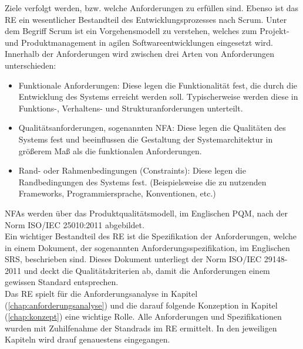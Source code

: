     Ziele verfolgt werden, bzw. welche Anforderungen zu erfüllen sind. Ebenso ist das \acl{RE} ein wesentlicher 
    Bestandteil des Entwicklungsprozesses nach Scrum. Unter dem Begriff Scrum ist ein Vorgehensmodell zu verstehen, 
    welches zum Projekt- und Produktmanagement in agilen Softwareentwicklungen eingesetzt wird. 
    \\
    \linebreak
    Innerhalb der Anforderungen %
    wird zwischen drei Arten von Anforderungen unterschieden: 
    \begin{itemize}
        \item Funktionale Anforderungen: Diese legen die Funktionalität fest, die durch die Entwicklung des Systems 
            erreicht werden soll. Typischerweise werden diese in Funktions-, Verhaltens- und Strukturanforderungen unterteilt.
        \item Qualitätsanforderungen, sogenannten \ac{NFA}: Diese legen die Qualitäten des Systems fest und beeinflussen die Gestaltung der 
            Systemarchitektur in größerem Maß als die funktionalen Anforderungen.
        \item Rand- oder Rahmenbedingungen (Constraints): Diese legen die Randbedingungen des Systems fest. (Beispielsweise die zu nutzenden Frameworks, Programmiersprache, Konventionen, etc.)
    \end{itemize}
    \acp{NFA} werden über das Produktqualitätsmodell, im Englischen \ac{PQM}, nach der Norm ISO/IEC 25010:2011 abgebildet. \cite{ISO-IEC-PQM2011}
    \\
    \linebreak
    Ein wichtiger Bestandteil des \acl{RE} ist die Spezifikation der Anforderungen, welche in einem Dokument, der 
    sogenannten Anforderungsspezifikation, im Englischen \ac{SRS}, beschrieben sind. Dieses Dokument unterliegt der 
    Norm ISO/IEC 29148-2011 und deckt die Qualitätskriterien ab, damit die Anforderungen einem gewissen Standard 
    entsprechen. 
    \\
    \linebreak
    Das \acl{RE} spielt für die Anforderungsanalyse in Kapitel (\ref{chap:anforderungsanalyse}) und die darauf folgende 
    Konzeption in Kapitel (\ref{chap:konzept}) eine wichtige Rolle. Alle Anforderungen und Spezifikationen wurden 
    mit Zuhilfenahme der Standrads im \acl{RE} ermittelt. In den jeweiligen Kapiteln wird drauf genauestens eingegangen. 

